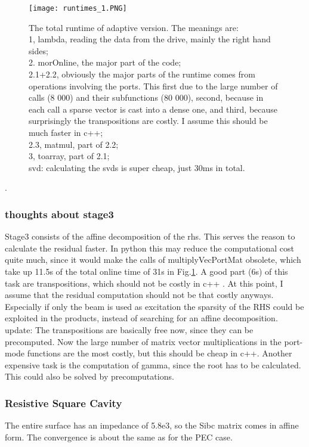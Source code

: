  
 \begin{figure}[h]
 	\centering
 	\texttt{[image: runtimes\_1.PNG]}
 	\caption{The total runtime of adaptive version. The meanings are:\\ 1, lambda, reading the data from the drive, mainly the right hand sides;\\ 2. morOnline, the major part of the code; \\2.1+2.2, obviously the major parts of the runtime comes from operations involving the ports. This first due to the large number of calls (8 000) and their subfunctions (80 000), second, because in each call a sparse vector is cast into a dense one, and third, because surprisingly the transpositions are costly. I assume this should be much faster in c++; \\2.3, matmul, part of 2.2;\\ 3, toarray, part of 2.1;\\ svd: calculating the svds is super cheap, just 30ms in total.}
 	\label{fig:st2_sqc_runtime1}
 \end{figure}

\newpage
.
\newpage
\subsubsection{thoughts about stage3}
Stage3 consists of the affine decomposition of the rhs. This serves the reason to calculate the residual faster. In python this may reduce the computational cost quite much, since it would make the calls of multiplyVecPortMat obsolete, which take up 11.5s of the total online time of 31s in Fig.\ref{fig:st2_sqc_runtime1}. A good part (6s) of this  task are transpositions, which should not be costly in c++ . At this point, I assume that the residual computation should not be that costly anyways. Especially if only the beam is used as excitation the sparsity of the RHS could be exploited in the products, instead of searching for an affine decomposition.\\

update: The transpositions are basically free now, since they can be precomputed. Now the large number of matrix vector multiplications in the port-mode functions are the most costly, but this should be cheap in c++. Another expensive task is the computation of gamma, since the root has to be calculated. This could also be solved by precomputations.


\newpage
\subsubsection{Resistive Square Cavity}
The entire surface has an impedance of 5.8e3, so the Sibc matrix comes in affine form.  The convergence is about the same as for the PEC case.


